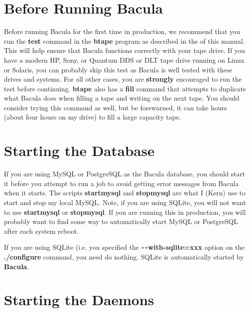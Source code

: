 \section{Before Running Bacula}


Before running Bacula for the first time in production, we recommend that you
run the {\bf test} command in the {\bf btape} program as described in the 
 of this manual. This will
help ensure that Bacula functions correctly with your tape drive. If you have
a modern HP, Sony, or Quantum DDS or DLT tape drive running on Linux or
Solaris, you can probably skip this test as Bacula is well tested with these
drives and systems. For all other cases, you are {\bf strongly} encouraged to
run the test before continuing. {\bf btape} also has a {\bf fill} command that
attempts to duplicate what Bacula does when filling a tape and writing on the
next tape. You should consider trying this command as well, but be forewarned,
it can take hours (about four hours on my drive) to fill a large capacity tape. 

\section{Starting the Database}
\label{StartDB}

If you are using MySQL or PostgreSQL as the Bacula database, you should start
it before you attempt to run a job to avoid getting error messages from Bacula
when it starts. The scripts {\bf startmysql} and {\bf stopmysql} are what I
(Kern) use to start and stop my local MySQL. Note, if you are using SQLite,
you will not want to use {\bf startmysql} or {\bf stopmysql}. If you are
running this in production, you will probably want to find some way to
automatically start MySQL or PostgreSQL after each system reboot. 

If you are using SQLite (i.e. you specified the {\bf \verb:--:with-sqlite=xxx} option
on the {\bf ./configure} command, you need do nothing. SQLite is automatically
started by {\bf Bacula}. 

\section{Starting the Daemons}
\label{StartDaemon}

